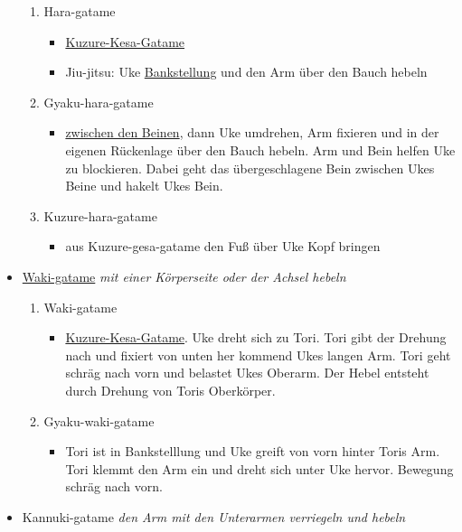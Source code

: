 \documentclass[justified, a4paper, notitlepage, captions=tableheading, nobib]{tufte-handout}
\begin{document}
\begin{itemize}
\begin{enumerate}
\item \label{orgb4dedb6}Hara-gatame 
\begin{itemize}
\item \hyperref[orgc8ed1bd]{Kuzure-Kesa-Gatame}
\item Jiu-jitsu: Uke \hyperref[orgf95c5ab]{Bankstellung} und den Arm über den Bauch hebeln
\end{itemize}
\item \label{org2e6da0d}Gyaku-hara-gatame
\begin{itemize}
\item \hyperref[orga527e99]{zwischen den Beinen}, dann Uke umdrehen, Arm fixieren und in der eigenen Rückenlage über den Bauch hebeln. Arm und Bein helfen Uke zu blockieren. Dabei geht das übergeschlagene Bein zwischen Ukes Beine und hakelt Ukes Bein.
\end{itemize}
\item \label{orga903aeb}Kuzure-hara-gatame 
\begin{itemize}
\item aus Kuzure-gesa-gatame den Fuß über Uke Kopf bringen
\end{itemize}
\end{enumerate}

\item \hyperref[orgdf10e51]{Waki-gatame} 
\emph{mit einer Körperseite oder der Achsel hebeln}

\begin{enumerate}
\item \label{orgdf10e51}Waki-gatame
\begin{itemize}
\item \hyperref[orgc8ed1bd]{Kuzure-Kesa-Gatame}. Uke dreht sich zu Tori. Tori gibt der Drehung nach und fixiert von unten her kommend Ukes langen Arm. Tori geht schräg nach vorn und belastet Ukes Oberarm. Der Hebel entsteht durch Drehung von Toris Oberkörper.
\end{itemize}
\item \label{orga96f692}Gyaku-waki-gatame 
\begin{itemize}
\item Tori ist in Bankstelllung und Uke greift von vorn hinter Toris Arm. Tori klemmt den Arm ein und dreht sich unter Uke hervor. Bewegung schräg nach vorn.
\end{itemize}
\end{enumerate}

\item Kannuki-gatame 
\emph{den Arm mit den Unterarmen verriegeln und hebeln}


\end{itemize}
\end{document}
